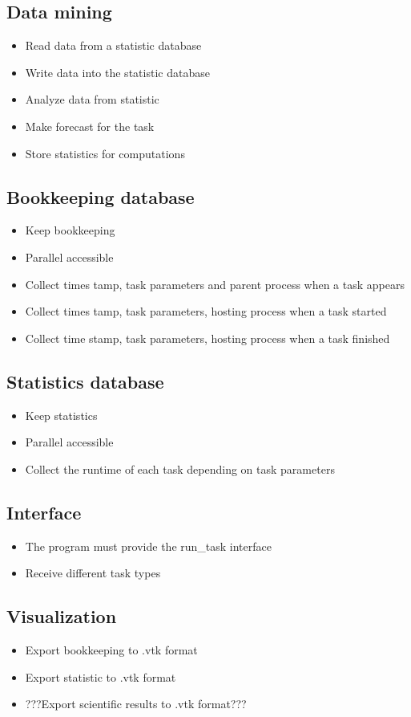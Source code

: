 {	
	\subsection{Data mining}
	
		\begin{itemize}
			\item Read data from a statistic database
			\item Write data into the statistic database
			\item Analyze data from statistic
			\item Make forecast for the task
			\item Store statistics for computations
		\end{itemize}
	
	
	\subsection{Bookkeeping database}
	
		\begin{itemize}
			\item Keep bookkeeping
			\item Parallel accessible
			\item Collect times tamp, task parameters and parent process when a task appears
			\item Collect times tamp, task parameters, hosting process when a task started
			\item Collect time stamp, task parameters, hosting process when a task finished
		\end{itemize}
	
	
	\subsection{Statistics database}
	
		\begin{itemize}
			\item Keep statistics
			\item Parallel accessible
			\item Collect the runtime of each task depending on task parameters
		\end{itemize}
	
	
	\subsection{Interface}
	
		\begin{itemize}
			\item The program must provide the run\_task interface
			\item Receive different task types
		\end{itemize}
		
		
	\subsection{Visualization}
	
		\begin{itemize}
			\item Export bookkeeping to .vtk format
			\item Export statistic to .vtk format
			\item ???Export scientific results to .vtk format??? 
		\end{itemize}

}